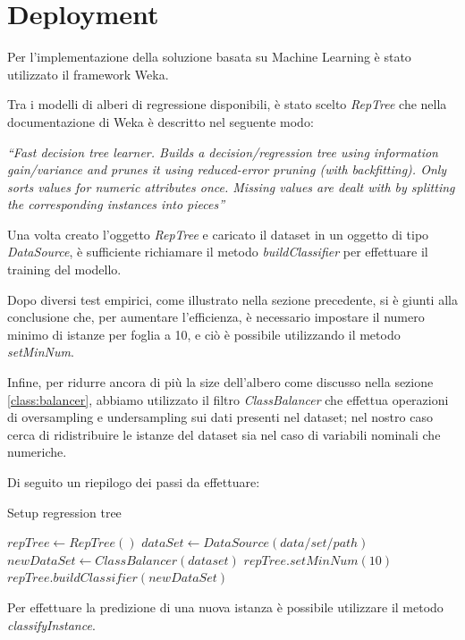 \documentclass[a4paper, 11pt, oneside]{report}
\begin{document}
            \section{Deployment}
            Per l'implementazione della soluzione basata su Machine Learning è stato utilizzato il framework Weka.\cite{2}\\
            \par \noindent Tra i modelli di alberi di regressione disponibili, è stato scelto \emph{RepTree} che nella documentazione di Weka è descritto nel seguente modo:
            \begin{center}
                \emph{``Fast decision tree learner. Builds a decision/regression tree using information gain/variance and prunes it using reduced-error pruning (with backfitting).
                Only sorts values for numeric attributes once. Missing values are dealt with by splitting the corresponding instances into pieces''}
            \end{center}
            Una volta creato l'oggetto \emph{RepTree} e caricato il dataset in un oggetto di tipo \emph{DataSource}, è sufficiente richiamare il metodo
            \emph{buildClassifier} per effettuare il training del modello.
            \par \noindent Dopo diversi test empirici, come illustrato nella sezione precedente, si è giunti alla conclusione che, per aumentare l'efficienza, è necessario
            impostare il numero minimo di istanze per foglia a 10, e ciò è possibile utilizzando il metodo \emph{setMinNum}.
            \par \noindent Infine, per ridurre ancora di più la size dell'albero come discusso nella sezione \ref{class:balancer}, abbiamo utilizzato il
            filtro \emph{ClassBalancer} che effettua operazioni di oversampling e undersampling sui dati presenti nel
            dataset; nel nostro caso cerca di ridistribuire le istanze del dataset sia nel caso di variabili nominali che
            numeriche.\\
            \par \noindent Di seguito un riepilogo dei passi da effettuare:
            \medskip
            \begin{algorithm}
                \caption{Setup regression tree}
                \label{alg:ml}
                \begin{algorithmic}[1]
                    \State $repTree \gets RepTree()$
                    \State $dataSet \gets DataSource(data/set/path)$
                    \State $newDataSet \gets ClassBalancer(dataset)$
                    \State
                    \State $repTree.setMinNum(10)$
                    \State $repTree.buildClassifier(newDataSet)$
                \end{algorithmic}
            \end{algorithm}
            \par \noindent Per effettuare la predizione di una nuova istanza è possibile utilizzare il metodo \emph{classifyInstance}.
\end{document}
